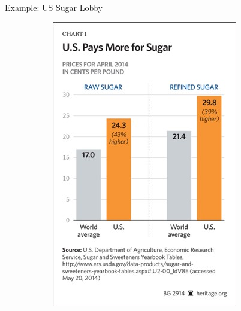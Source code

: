 \documentclass[handout]{beamer}
\begin{document}
\begin{frame}{\LARGE Example: US Sugar Lobby}
	\begin{figure}
		\centering
		\begin{subfigure}{0.49\textwidth}
			\centering
			\includegraphics[width = \textwidth,height=.9\textheight]{sugar1.jpg}
		\end{subfigure}
		\begin{subfigure}{0.49\textwidth}
			\centering

\end{subfigure}
\end{figure}
\end{frame}
\end{document}
